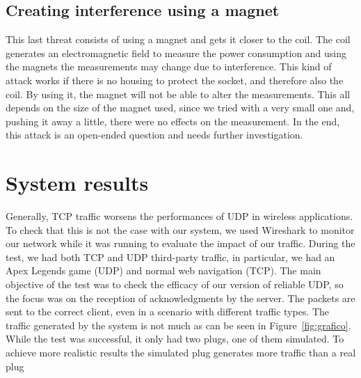 \documentclass[conference]{IEEEtran}
\begin{document}
	\subsection{Creating interference using a magnet}
	This last threat consists of using a magnet and gets it closer to the coil. The coil generates an electromagnetic field to measure the power consumption and using the magnets the measurements may change due to interference. This kind of attack works if there is no housing to protect the socket, and therefore also the coil. By using it, the magnet will not be able to alter the measurements. This all depends on the size of the magnet used, since we tried with a very small one and, pushing it away a little, there were no effects on the measurement. In the end, this attack is an open-ended question and needs further investigation.  
	\section{System results}
	Generally, TCP traffic worsens the performances of UDP in wireless applications. To check that this is not the case with our system, we used Wireshark to monitor our network while it was running to evaluate the impact of our traffic. During the test, we had both TCP and UDP third-party traffic, in particular, we had an Apex Legends game (UDP) and normal web navigation (TCP). The main objective of the test was to check the efficacy of our version of reliable UDP, so the focus was on the reception of acknowledgments by the server. The packets are sent to the correct client, even in a scenario with different traffic types. The traffic generated by the system is not much as can be seen in Figure~\ref{fig:grafico}. While the test was successful, it only had two plugs, one of them simulated. To achieve more realistic results the simulated plug generates more traffic than a real plug
\end{document}
